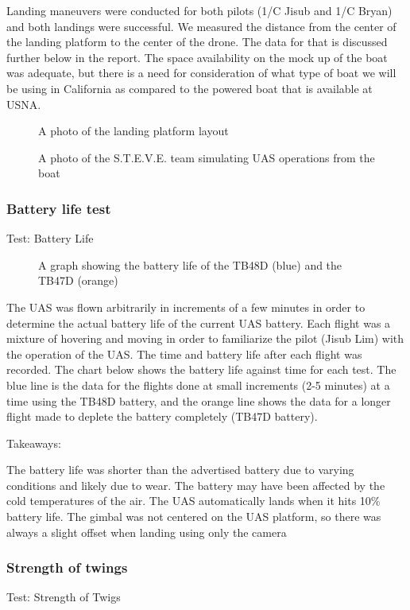 \documentclass{wrcecapstone}
\begin{document}
Landing maneuvers were conducted for both pilots (1/C Jisub and 1/C Bryan) and both landings were successful. We measured the distance from the center of the landing platform to the center of the drone. The data for that is discussed further below in the report. The space availability on the mock up of the boat was adequate, but there is a need for consideration of what type of boat we will be using in California as compared to the powered boat that is available at USNA. 
\begin{figure}
\caption{A photo of the landing platform layout}
\end{figure}
\begin{figure}
\caption{A photo of the S.T.E.V.E. team simulating UAS operations from the boat}
\end{figure}

\subsubsection{Battery life test}
Test: Battery Life
\begin{figure}
\caption{A graph showing the battery life of the TB48D (blue) and the TB47D (orange)}
\end{figure}

The UAS was flown arbitrarily in increments of a few minutes in order to determine the actual battery life of the current UAS battery.  Each flight was a mixture of hovering and moving in order to familiarize the pilot (Jisub Lim) with the operation of the UAS.  The time and battery life after each flight was recorded.  The chart below shows the battery life against time for each test.  The blue line is the data for the flights done at small increments (2-5 minutes) at a time using the TB48D battery, and the orange line shows the data for a longer flight made to deplete the battery completely (TB47D battery).

Takeaways:  

The battery life was shorter than the advertised battery due to varying conditions and likely due to wear. The battery may have been affected by the cold temperatures of the air. The UAS automatically lands when it hits 10\% battery life. The gimbal was not centered on the UAS platform, so there was always a slight offset when landing using only the camera




\subsubsection{Strength of twings}
Test: Strength of Twigs
\end{document}
